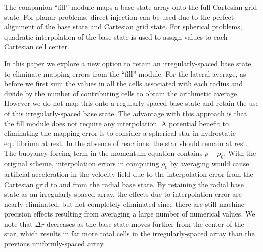 The companion ``fill'' module maps a base state array onto the full Cartesian grid state.
For planar problems, direct injection can be used due to the perfect alignment of the base state and Cartesian grid state.
For spherical problems, quadratic interpolation of the base state is used to assign values to each Cartesian cell center.

In this paper we explore a new option to retain an irregularly-spaced base state to eliminate mapping errors from the ``fill'' module.
For the lateral average, as before we first sum the values in all the cells associated with each radius and divide
by the number of contributing cells to obtain the arithmetic average.  However we do not map this onto a regularly spaced
base state and retain the use of this irregularly-spaced base state.
The advantage with this approach is that the fill module does not require any interpolation.
A potential benefit to eliminating the mapping error is to consider a spherical star in hydrostatic equilibrium at rest.
In the absence of reactions, the star should remain at rest.
The buoyancy forcing term in the momentum equation contains $\rho-\rho_0$.  With the original scheme, interpolation errors 
in computing $\rho_0$ by averaging would cause artificial acceleration in the velocity field due to the interpolation error 
from the Cartesian grid to and from the radial base state.  By retaining the radial base state as an irregularly spaced 
array, the effects due to interpolation error are nearly eliminated, but not completely eliminated since there are still 
machine precision effects resulting from averaging a large number of numerical values.
We note that $\Delta r$ decreases as the base state moves further from the center of the star, 
which results in far more total cells in the irregularly-spaced array than the previous uniformly-spaced array. 

